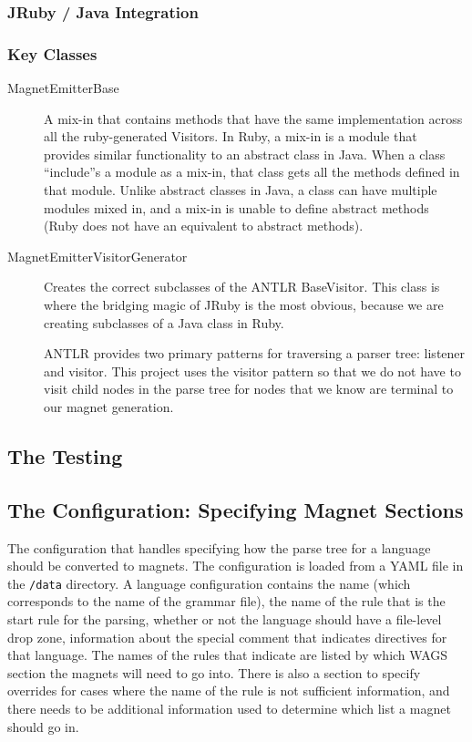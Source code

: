 \documentclass[letter,10pt]{article}
\begin{document}
\subsubsection{JRuby / Java Integration}

\subsubsection{Key Classes}

\begin{description}
 \item [MagnetEmitterBase] A mix-in that contains methods that have the 
same implementation across all the ruby-generated Visitors. In Ruby, a 
mix-in is a module that provides similar functionality to an abstract 
class in Java. When a class ``include''s a module as a mix-in, that 
class gets all the methods defined in that module. Unlike abstract 
classes in Java, a class can have multiple modules mixed in, and a 
mix-in is unable to define abstract methods (Ruby does not have an 
equivalent to abstract methods).

\item[MagnetEmitterVisitorGenerator] Creates the correct subclasses of 
the ANTLR BaseVisitor. This class is where the bridging magic of JRuby 
is the most obvious, because we are creating subclasses of a Java class 
in Ruby.

ANTLR provides two primary patterns for traversing a parser tree: 
listener and visitor. This project uses the visitor pattern so that we 
do not have to visit child nodes in the parse tree for nodes that we 
know are terminal to our magnet generation. 

\end{description}


\subsection{The Testing}

\subsection{The Configuration: Specifying Magnet Sections}
\label{sec:newConfig}

The configuration that handles specifying how the parse tree for a 
language should be converted to magnets. The configuration is loaded 
from a YAML file in the \verb~/data~ directory. A language 
configuration contains the name (which corresponds to the 
name of the grammar file), the name of the rule that is the start rule 
for the parsing, whether or not the language should have a file-level 
drop zone, information about the special comment that indicates 
directives for that language. The names of the rules that indicate are 
listed by which WAGS section the magnets will need to go into. There is 
also a section to specify overrides for cases where the name of the 
rule is not sufficient information, and there needs to be additional 
information used to determine which list a magnet should go in.
\end{document}
